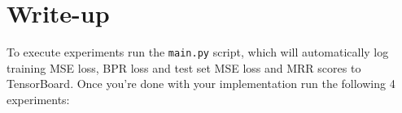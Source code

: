 \documentclass[12pt]{article}
\begin{document}



\section{Write-up}
To execute experiments run the \texttt{main.py} script, which will automatically log training MSE loss, BPR loss and test set MSE loss and MRR scores to TensorBoard. Once you're done with your implementation run the following 4 experiments:
\end{document}
